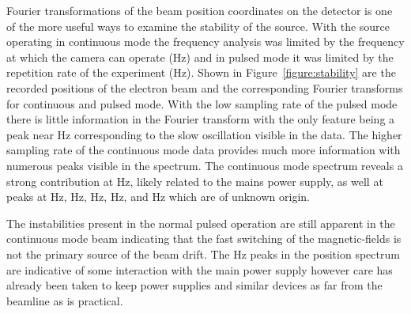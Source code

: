 Fourier transformations of the beam position coordinates on the detector is one of the more useful ways to examine the stability of the source.
With the source operating in continuous mode the frequency analysis was limited by the frequency at which the camera can operate (\unit[240]{Hz}) and in pulsed mode it was limited by the repetition rate of the experiment (\unit[10]{Hz}).
Shown in Figure~\ref{figure:stability} are the recorded positions of the electron beam and the corresponding Fourier transforms for continuous and pulsed mode.
With the low sampling rate of the pulsed mode there is little information in the Fourier transform with the only feature being a peak near \unit[0]{Hz} corresponding to the slow oscillation visible in the data.
The higher sampling rate of the continuous mode data provides much more information with numerous peaks visible in the spectrum.
The continuous mode spectrum reveals a strong contribution at \unit[50]{Hz}, likely related to the mains power supply, as well at peaks at \unit[0]{Hz}, \unit[45]{Hz}, \unit[67]{Hz}, \unit[84]{Hz}, and \unit[92]{Hz} which are of unknown origin.

The instabilities present in the normal pulsed operation are still apparent in the continuous mode beam indicating that the fast switching of the magnetic-fields is not the primary source of the beam drift.
The \unit[50]{Hz} peaks in the position spectrum are indicative of some interaction with the main power supply however care has already been taken to keep power supplies and similar devices as far from the beamline as is practical.

